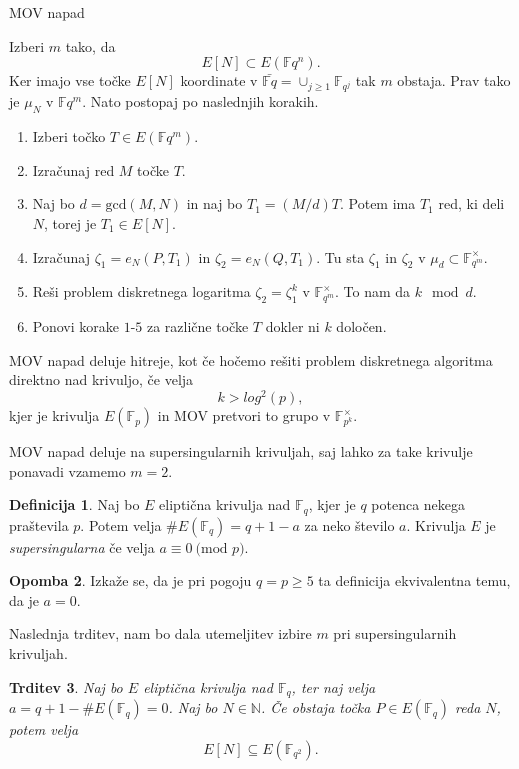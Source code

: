 \documentclass[12pt,a4paper,twoside]{article}
\theoremstyle{definition} %
\newtheorem{definicija}{Definicija}[section]
\newtheorem{opomba}[definicija]{Opomba}
\theoremstyle{plain} %
\newtheorem{trditev}[definicija]{Trditev}
\numberwithin{equation}{section}  %
\newcommand{\N}{\mathbb N}
\newcommand{\F}{\mathbb F}
\newcommand{\E}[1]{E({#1})}
\newcommand{\MOD}[1]{\ \text{(mod }{#1}\text{)}}
\begin{document}
\begin{algorithm}[H]
\caption[MOV]{MOV napad}
\label{alg:MOV}
Izberi $m$ tako, da $$E[N] \subset \E{\F{q^n}}.$$
Ker imajo vse točke $E[N]$ koordinate v $\bar{\F{q}} = \cup_{j\geq 1}\F_{q^j}$ tak $m$ obstaja. Prav tako je $\mu_N$ v $\F{q^m}$.
Nato postopaj po naslednjih korakih.
\begin{enumerate}
\item Izberi točko $T \in \E{\F{q^m}}$.
\item Izračunaj red $M$ točke $T$.
\item Naj bo $d = \text{gcd}(M,N)$ in naj bo $T_1 = (M/d)T$. Potem ima $T_1$ red, ki deli $N$, torej je $T_1 \in E[N]$.
\item Izračunaj $\zeta_1 = e_N(P,T_1)$ in $\zeta_2 = e_N(Q,T_1)$. Tu sta $\zeta_1$ in $\zeta_2$ v $\mu_d \subset \F_{q^m}^\times$.
\item Reši problem diskretnega logaritma $\zeta_2 = \zeta_1^k$ v $\F_{q^m}^\times$. To nam da $k \mod d$.
\item Ponovi korake $1$-$5$ za različne točke $T$ dokler ni $k$ določen.
\end{enumerate}

\end{algorithm}
MOV napad deluje hitreje, kot če hočemo rešiti problem diskretnega algoritma direktno nad krivuljo, če velja 
$$k > log^2(p),$$
kjer je krivulja $E(\F_p)$ in MOV pretvori to grupo v $\F^{\times}_{p^k}$.

MOV napad deluje na supersingularnih krivuljah, saj lahko za take krivulje ponavadi vzamemo $m=2$.

\begin{definicija}
Naj bo $E$ eliptična krivulja nad $\F_q$, kjer je $q$ potenca nekega praštevila $p$. Potem velja $\#\E{\F_q} = q+1-a$ za neko število $a$. Krivulja $E$ je \emph{supersingularna} če velja $a \equiv 0 \MOD{p}$.
\end{definicija}

\begin{opomba}
Izkaže se, da je pri pogoju $q=p \geq 5$ ta definicija ekvivalentna temu, da je $a=0$.
\end{opomba}
Naslednja trditev, nam bo dala utemeljitev izbire $m$ pri supersingularnih krivuljah.

\begin{trditev}
Naj bo $E$ eliptična krivulja nad $\F_q$, ter naj velja $a = q+1-\#\E{\F_q} =0$. Naj bo $N\in \N$. Če obstaja točka $P \in \E{\F_q}$ reda $N$, potem velja
$$E[N] \subseteq \E{\F_{q^2}}.$$
\end{trditev}
\end{document}
